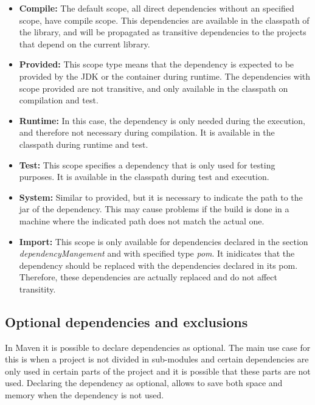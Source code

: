 \begin{itemize}
  \item \textbf{Compile:} The default scope, all direct dependencies without an specified scope, have compile scope. This dependencies are available in the classpath of the library, and will be propagated as transitive dependencies to the projects that depend on the current library.

  \item \textbf{Provided:} This scope type means that the dependency is expected to be provided by the JDK or the container during runtime. The dependencies with scope provided are not transitive, and only available in the classpath on compilation and test.

  \item \textbf{Runtime:} In this case, the dependency is only needed during the execution, and therefore not necessary during compilation. It is available in the classpath during runtime and test.

  \item \textbf{Test:} This scope specifies a dependency that is only used for testing purposes. It is available in the classpath during test and execution.

  \item \textbf{System:} Similar to provided, but it is necessary to indicate the path to the jar of the dependency. This may cause problems if the build is done in a machine where the indicated path does not match the actual one.

  \item \textbf{Import:} This scope is only available for dependencies declared in the section \textit{dependencyMangement} and with specified type \textit{pom}. It inidicates that the dependency should be replaced with the dependencies declared in its pom. Therefore, these dependencies are actually replaced and do not affect transitity.
\end{itemize}

\subsection{Optional dependencies and exclusions}
In Maven it is possible to declare dependencies as optional. The main use case for this is when a project is not divided in sub-modules and certain dependencies are only used in certain parts of the project and it is possible that these parts are not used. Declaring the dependency as optional, allows to save both space and memory when the dependency is not used.

